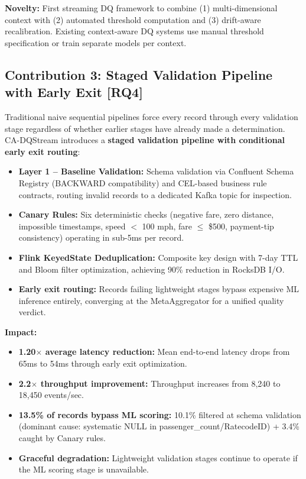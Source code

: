 \textbf{Novelty:} First streaming DQ framework to combine (1) multi-dimensional context with (2) automated threshold computation and (3) drift-aware recalibration. Existing context-aware DQ systems use manual threshold specification or train separate models per context.

\subsection{Contribution 3: Staged Validation Pipeline with Early Exit [RQ4]}

Traditional naive sequential pipelines force every record through every validation stage regardless of whether earlier stages have already made a determination. CA-DQStream introduces a \textbf{staged validation pipeline with conditional early exit routing}:

\begin{itemize}
    \item \textbf{Layer 1 -- Baseline Validation:} Schema validation via Confluent Schema Registry (BACKWARD compatibility) and CEL-based business rule contracts, routing invalid records to a dedicated Kafka topic for inspection.
    \item \textbf{Canary Rules:} Six deterministic checks (negative fare, zero distance, impossible timestamps, speed $<$ 100 mph, fare $\leq$ \$500, payment-tip consistency) operating in sub-5ms per record.
    \item \textbf{Flink KeyedState Deduplication:} Composite key design with 7-day TTL and Bloom filter optimization, achieving 90\% reduction in RocksDB I/O.
    \item \textbf{Early exit routing:} Records failing lightweight stages bypass expensive ML inference entirely, converging at the MetaAggregator for a unified quality verdict.
\end{itemize}

\textbf{Impact:}
\begin{itemize}
    \item \textbf{1.20$\times$ average latency reduction:} Mean end-to-end latency drops from 65ms to 54ms through early exit optimization.
    \item \textbf{2.2$\times$ throughput improvement:} Throughput increases from 8,240 to 18,450 events/sec.
    \item \textbf{13.5\% of records bypass ML scoring:} 10.1\% filtered at schema validation (dominant cause: systematic NULL in passenger\_count/RatecodeID) + 3.4\% caught by Canary rules.
    \item \textbf{Graceful degradation:} Lightweight validation stages continue to operate if the ML scoring stage is unavailable.
\end{itemize}

